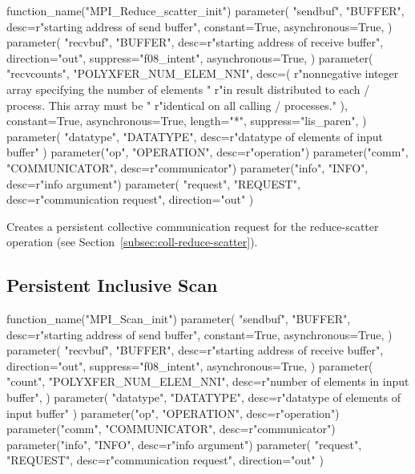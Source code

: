 %
\begin{mpi-binding}
    function_name("MPI_Reduce_scatter_init")
    parameter(
        "sendbuf",
        "BUFFER",
        desc=r"starting address of send buffer",
        constant=True,
        asynchronous=True,
    )
    parameter(
        "recvbuf",
        "BUFFER",
        desc=r"starting address of receive buffer",
        direction="out",
        suppress="f08_intent",
        asynchronous=True,
    )
    parameter(
        "recvcounts",
        "POLYXFER_NUM_ELEM_NNI",
        desc=(
            r"nonnegative integer array specifying the number of elements "
            r"in result distributed to each \MPI/ process. This array must be "
            r"identical on all calling \MPI/ processes."
        ),
        constant=True,
        asynchronous=True,
        length="*",
        suppress="lis_paren",
    )
    parameter(
        "datatype", "DATATYPE", desc=r"datatype of elements of input buffer"
    )
    parameter("op", "OPERATION", desc=r"operation")
    parameter("comm", "COMMUNICATOR", desc=r"communicator")
    parameter("info", "INFO", desc=r"info argument")
    parameter(
        "request", "REQUEST", desc=r"communication request", direction="out"
    )
\end{mpi-binding}

Creates a persistent collective communication request for the reduce-scatter operation
(see Section~\ref{subsec:coll-reduce-scatter}).

\subsection{Persistent Inclusive Scan}
\label{subsec:pcoll-scan}

%
\begin{mpi-binding}
    function_name("MPI_Scan_init")
    parameter(
        "sendbuf",
        "BUFFER",
        desc=r"starting address of send buffer",
        constant=True,
        asynchronous=True,
    )
    parameter(
        "recvbuf",
        "BUFFER",
        desc=r"starting address of receive buffer",
        direction="out",
        suppress="f08_intent",
        asynchronous=True,
    )
    parameter(
        "count",
        "POLYXFER_NUM_ELEM_NNI",
        desc=r"number of elements in input buffer",
    )
    parameter(
        "datatype", "DATATYPE", desc=r"datatype of elements of input buffer"
    )
    parameter("op", "OPERATION", desc=r"operation")
    parameter("comm", "COMMUNICATOR", desc=r"communicator")
    parameter("info", "INFO", desc=r"info argument")
    parameter(
        "request", "REQUEST", desc=r"communication request", direction="out"
    )
\end{mpi-binding}

